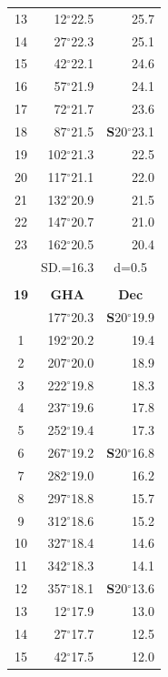 \documentclass[10pt, a4paper]{report}
\begin{document}
\begin{scriptsize}
\begin{tabular*}{0.2\textwidth}[t]{@{\extracolsep{\fill}}|c|rr|}
13 & 12$^\circ$22.5 & 25.7\\
14 & 27$^\circ$22.3 & 25.1\\
15 & 42$^\circ$22.1 & \raisebox{0.24ex}{\boldmath$\cdot$~\boldmath$\cdot$~~}24.6\\
16 & 57$^\circ$21.9 & 24.1\\
17 & 72$^\circ$21.7 & 23.6\\[2Pt]
18 & 87$^\circ$21.5 & \textbf{S}20$^\circ$23.1\\
19 & 102$^\circ$21.3 & 22.5\\
20 & 117$^\circ$21.1 & 22.0\\
21 & 132$^\circ$20.9 & \raisebox{0.24ex}{\boldmath$\cdot$~\boldmath$\cdot$~~}21.5\\
22 & 147$^\circ$20.7 & 21.0\\
23 & 162$^\circ$20.5 & 20.4\\
\hline
\rule{0pt}{2.4ex} & \multicolumn{1}{c}{SD.=16.3} & \multicolumn{1}{c|}{d=0.5}\\
\hline
\multicolumn{1}{c}{}\\[-0.5ex]\hline
\multicolumn{1}{|c|}{\rule{0pt}{2.6ex}\textbf{19}} & \multicolumn{1}{c}{\textbf{GHA}} & \multicolumn{1}{c|}{\textbf{Dec}}\\
\hline\rule{0pt}{2.6ex}\noindent
0 & 177$^\circ$20.3 & \textbf{S}20$^\circ$19.9\\
1 & 192$^\circ$20.2 & 19.4\\
2 & 207$^\circ$20.0 & 18.9\\
3 & 222$^\circ$19.8 & \raisebox{0.24ex}{\boldmath$\cdot$~\boldmath$\cdot$~~}18.3\\
4 & 237$^\circ$19.6 & 17.8\\
5 & 252$^\circ$19.4 & 17.3\\[2Pt]
6 & 267$^\circ$19.2 & \textbf{S}20$^\circ$16.8\\
7 & 282$^\circ$19.0 & 16.2\\
8 & 297$^\circ$18.8 & 15.7\\
9 & 312$^\circ$18.6 & \raisebox{0.24ex}{\boldmath$\cdot$~\boldmath$\cdot$~~}15.2\\
10 & 327$^\circ$18.4 & 14.6\\
11 & 342$^\circ$18.3 & 14.1\\[2Pt]
12 & 357$^\circ$18.1 & \textbf{S}20$^\circ$13.6\\
13 & 12$^\circ$17.9 & 13.0\\
14 & 27$^\circ$17.7 & 12.5\\
15 & 42$^\circ$17.5 & \raisebox{0.24ex}{\boldmath$\cdot$~\boldmath$\cdot$~~}12.0\\

\end{tabular*}
\end{scriptsize}
\end{document}
